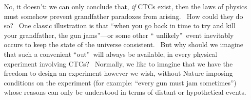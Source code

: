 \documentclass[11pt,onecolumn]{article}%
\begin{document}
No, it doesn't: we can only conclude that, \textit{if} CTCs exist, then the
laws of physics must somehow prevent grandfather paradoxes from arising. \ How
could they do so? \ One classic illustration is that \textquotedblleft when
you go back in time to try and kill your grandfather, the gun
jams\textquotedblright---or some other \textquotedblleft
unlikely\textquotedblright\ event inevitably occurs to keep the state of the
universe consistent. \ But why should we imagine that such a convenient
\textquotedblleft out\textquotedblright\ will always be available, in every
physical experiment involving CTCs? \ Normally, we like to imagine that we
have the freedom to design an experiment however we wish, without Nature
imposing conditions on the experiment (for example: \textquotedblleft every
gun must jam sometimes\textquotedblright) whose reasons can only be understood
in terms of distant or hypothetical events.
\end{document}

